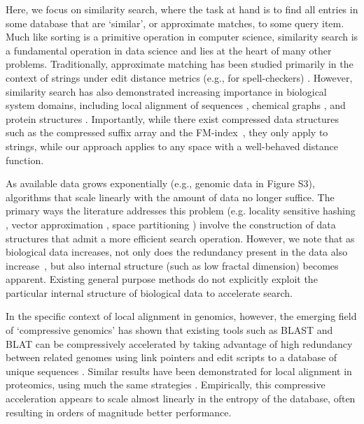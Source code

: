 \documentclass[review,preprint,12pt]{elsarticle}
\renewcommand{\cite}{\citep} %
\theoremstyle{definition}
\theoremstyle{remark}
\numberwithin{equation}{section}
\begin{document}
Here, we focus on similarity search, where the task at hand is to find all entries in some database that are `similar', or approximate matches, to some query item.
Much like sorting is a primitive operation in computer science, similarity search is a fundamental operation in data science and lies at the heart of many other problems.
Traditionally, approximate matching has been studied primarily in the context of strings under edit distance metrics (e.g., for spell-checkers) \cite{ukkonen1985algorithms}.
However, similarity search has also demonstrated increasing importance in biological system domains, including local alignment of sequences \cite{altschul1990basic, kent2002blat}, chemical graphs \cite{schaeffer2007graph}, and protein structures \cite{budowski2010fragbag}.
Importantly, while there exist compressed data structures such as the 
compressed suffix array and the FM-index~\cite{grossi2005compressed, ferragina2000opportunistic}, they only apply to strings, while our approach 
applies to any space with a well-behaved distance function.

As available data grows exponentially \cite{berger2013computational,yu2015quality} (e.g., genomic data in Figure S3), 
algorithms that scale linearly with the amount of data no longer suffice.
The primary ways the literature addresses this problem (e.g.
locality sensitive hashing \cite{indyk1998approximate}, vector approximation \cite{ferhatosmanoglu2000vector}, space partitioning \cite{weber1998quantitative}) involve the construction of data structures that admit a more efficient search operation.
However, we note that as biological data increases, not only does the redundancy present in the data also increase~\cite{loh2012compressive}, but also internal structure (such as low fractal dimension) becomes apparent.
Existing general purpose methods do not explicitly exploit the particular internal structure of biological data to accelerate search.

In the specific context of local alignment in genomics, however, the emerging field of `compressive genomics' has shown that existing tools such as BLAST and BLAT can be compressively accelerated by taking advantage of high redundancy between related genomes using link pointers and edit scripts to a database of unique sequences \cite{loh2012compressive}.
Similar results have been demonstrated for local alignment in proteomics, using much the same strategies \cite{daniels2013compressive}.
Empirically, this compressive acceleration appears to scale almost linearly in the entropy of the database, often resulting in orders of magnitude better performance.
\end{document}
